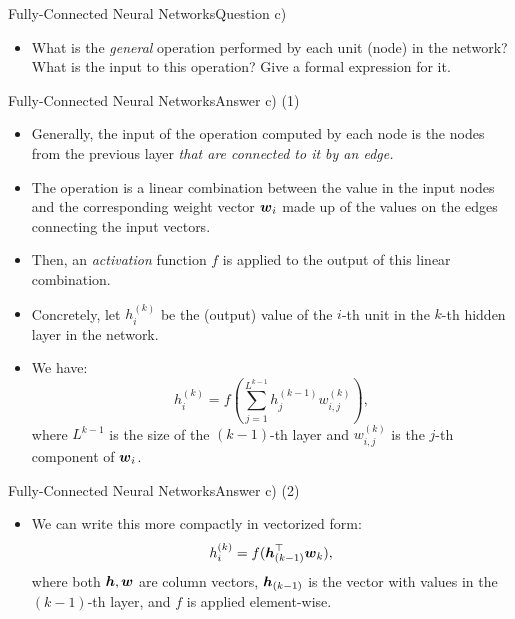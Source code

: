 \documentclass[t]{beamer}
\begin{document}
\begin{frame}{Fully-Connected Neural Networks}{Question c)}
    \begin{itemize}
        \item What is the \emph{general} operation performed
              by each unit (node) in the network? What is the input to this
              operation? Give a formal expression for it.
    \end{itemize}
\end{frame}

\begin{frame}{Fully-Connected Neural Networks}{Answer c) (1)}
    \begin{itemize}
        \item Generally, the input of the operation computed by
              each node is the nodes from the previous layer
              \emph{that are connected to it by an edge.}
        \item The operation is a linear combination between the value in
              the input nodes and the corresponding weight vector ${\boldsymbol{w}}_i$ made
              up of the values on the edges connecting the input vectors.
        \item Then, an \emph{activation} function $f$ is applied to the output
              of this linear combination.
        \item Concretely, let $h_i^{(k)}$ be the (output) value of the $i$-th
              unit in the $k$-th hidden layer in the network.
        \item We have:
              \begin{equation*}
                  h^{(k)}_i = f\left(\sum_{j=1}^{L^{k-1}}{h_j^{(k-1)} w_{i,j}^{(k)}}\right),
              \end{equation*}
              where $L^{k-1}$ is the size of the $(k-1)$-th layer and
              $w_{i,j}^{(k)}$ is the $j$-th component of ${\boldsymbol{w}}_i$.
    \end{itemize}
\end{frame}

\begin{frame}{Fully-Connected Neural Networks}{Answer c) (2)}
    \begin{itemize}
        \item We can write this more compactly in vectorized form:
              \begin{equation*}
                  h^{(k)}_i = f({\boldsymbol{h}}_{(k-1)}^\top{\boldsymbol{w}}_k),
              \end{equation*}
              where both ${\boldsymbol{h}},{\boldsymbol{w}}$ are column vectors, ${\boldsymbol{h}}_{(k-1)}$ is the
              vector with values in the $(k-1)$-th layer, and $f$ is applied
              element-wise.
    \end{itemize}
\end{frame}
\end{document}
